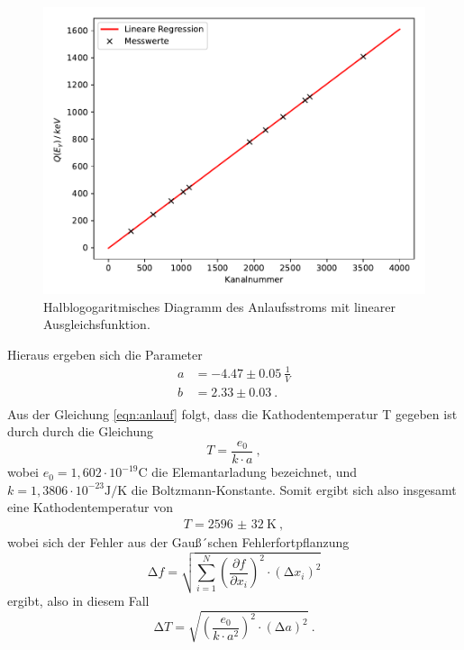 \begin{figure}[H]
  \centering
  \includegraphics{plot3.pdf}
  \caption{Halblogogaritmisches Diagramm des Anlaufsstroms mit linearer Ausgleichsfunktion.}
  \label{fig:plot3}
\end{figure}
Hieraus ergeben sich die Parameter
\begin{align*}
  a &= -4.47 \pm 0.05 \: \frac{1}{V}\\
  b &= 2.33 \pm 0.03  \: .\\
\end{align*}
Aus der Gleichung \ref{eqn:anlauf} folgt, dass die Kathodentemperatur T gegeben ist durch
durch die Gleichung
\begin{equation}
  T = \frac{e_0}{k \cdot a} \: ,
\end{equation}
wobei $e_0= 1,602 \cdot 10^{-19} \si{\coulomb} $ \cite{q1} die Elemantarladung bezeichnet,
und $k=1,3806 \cdot 10^{-23} \si{\joule\per\kelvin} $ \cite{q2} die Boltzmann-Konstante.
Somit ergibt sich also insgesamt eine Kathodentemperatur von
\begin{align*}
  T= \SI{2596(32)}{\kelvin} \: ,
\end{align*}
wobei sich der Fehler aus der Gauß´schen Fehlerfortpflanzung
\begin{equation}
  \increment f = \sqrt{ \sum_{i=1}^N \left( \frac{\partial f}{\partial x_i}\right)^2
  \cdot (\increment x_i)^2  }
  \label{eqn:gaus}
\end{equation}
ergibt, also in diesem Fall
\begin{equation}
  \increment T = \sqrt{(\frac{e_0}{k \cdot a^2})^2 \cdot (\increment a)^2} \: .
\end{equation}
